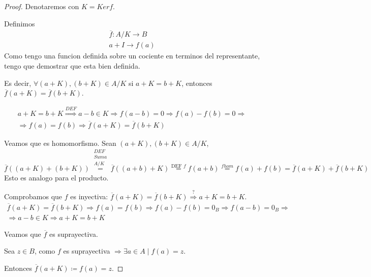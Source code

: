 \begin{proof}
	Denotaremos con \(K = Kerf \).
	
	Definimos
	\[
		\begin{aligned}
			\overline{f} \colon A/K \to B \\
			a + I \to f(a)
		\end{aligned}
	\]
	Como tengo una funcion definida sobre un cociente en terminos del representante, tengo que demostrar que esta bien definida.
	
	Es decir, \(\forall (a + K), (b + K) \in A/K \) si \(a + K = b + K \), entonces \(\overline{f}(a+K) = \overline{f}(b + K)\).
	
	\begin{multline*}
		a + K = b + K \overset{DEF}{\Rightarrow} a - b \in K \Rightarrow f(a-b) = 0 \Rightarrow f(a) - f(b) = 0 \Rightarrow \\ \Rightarrow f(a) = f(b) \Rightarrow \overline{f}(a + K) = \overline{f}(b + K)
	\end{multline*}
	
	Veamos que es homomorfismo. Sean \((a + K), (b + K) \in A/K \),
	\[
		\overline{f}((a + K) + (b + K)) \overset{\substack{DEF \\Suma\\ A/K}}{=} \overline{f}((a + b) + K) \overset{\text{DEF }  f}{=} f(a + b) \overset{f hom}{=} f(a) + f(b) = \overline{f}(a + K) + \overline{f}(b + K )
	\]
	Esto es analogo para el producto.
	
	Comprobamos que \(f \) es inyectiva: \(\overline{f}(a + K) = \overline{f}(b + K) \overset{?}{\Rightarrow} a + K = b + K \).
	\begin{multline*}
		\overline{f}(a + K) = \overline{f}(b + K) \Rightarrow f(a) = f(b) \Rightarrow f(a) - f(b) = 0_B \Rightarrow f(a-b) = 0_B \Rightarrow \\ \Rightarrow a - b \in K \Rightarrow a + K = b + K
	\end{multline*}
	
	Veamos que \(\overline{f }\) es suprayectiva.
	
	Sea \(z \in B \), como \(f \) es suprayectiva \(\Rightarrow \exists a \in A \mid f(a) = z \).
	
	Entonces \(\overline{f}(a + K) \coloneqq f(a) = z \).
\end{proof}

